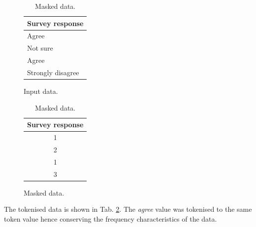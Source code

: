 \documentclass[a4paper,twoside,12pt]{book}
\begin{document}
\begin{table}
\centering
\caption{Tokenisation.}
\begin{subfigure}{.4\textwidth}
	\centering
	\caption{Input data.}
	\label{id:tab:tokenisation_raw}
	\begin{tabular}{l}
	\toprule
	Survey response\\ \midrule
	Agree                               \\
	Not sure                            \\
	Agree                               \\
	Strongly disagree                   \\ \bottomrule
	\end{tabular}
\end{subfigure}
\begin{subfigure}{.4\textwidth}
	\centering
	\caption{Masked data.}
	\label{id:tab:tokenisation_masked}
	\begin{tabular}{c}
	\toprule
	Survey response \\ \midrule
	1                                   \\
	2                                   \\
	1                                   \\
	3                                   \\ \bottomrule
	\end{tabular}
\end{subfigure}
\end{table}
%
The tokenised data is shown in Tab. \ref{id:tab:tokenisation_masked}. The \textit{agree} value was tokenised to the same token value hence conserving the frequency characteristics of the data.

%
\end{document}
